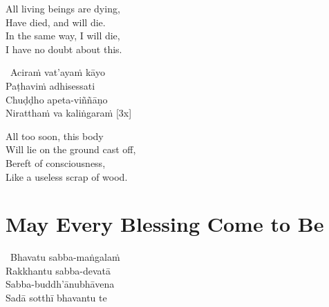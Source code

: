\begin{english-verses}
  All living beings are dying,\\
  Have died, and will die.\\
  In the same way, I will die,\\
  I have no doubt about this.
\end{english-verses}

\ifafive\vspace{-0.2em}\fi

\suttaRef{[Thai]}

\ifninebythirteen\clearpage\fi

\begin{pali-hang-together}
  \anglebracketleft\ \hspace{-0.5mm}Aciraṁ vat'ayaṁ kāyo \hspace{-0.5mm}\anglebracketright\ \\
  Paṭhaviṁ adhisessati\\
  Chuḍḍho apeta-viññāṇo\\
  Niratthaṁ va kaliṅgaraṁ \hfill{[3x]}
\end{pali-hang-together}

\ifbfive\clearpage\fi

\begin{english-verses}
  All too soon, this body\\
  Will lie on the ground cast off,\\
  Bereft of consciousness,\\
  Like a useless scrap of wood.
\end{english-verses}

\ifafive\vspace{-0.6em}\fi

\suttaRef{[Dhp 41]}



\section{May Every Blessing Come to Be}
\label{bhavatu-funeral}

\begin{pali-hang-together}
  \anglebracketleft\ \hspace{-0.5mm}Bhavatu sabba-maṅgalaṁ \hspace{-0.5mm}\anglebracketright\ \\
  Rakkhantu sabba-devatā\\
  Sabba-buddh'ānubhāvena\\
  Sadā sotthī bhavantu te
\end{pali-hang-together}

